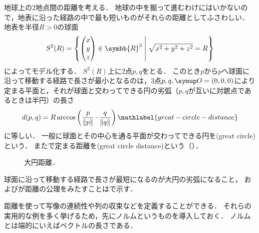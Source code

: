 \documentclass{ltjsbook}
\begin{document}
\begin{example}
地球上の\(2\)地点間の距離を考える．
地球の中を掘って進むわけにはいかないので，地表に沿った経路の中で最も短いものがそれらの距離としてふさわしい．
地表を半径\(R > 0\)の球面
\begin{align*}
    S^2(R) = \left\{ \begin{pmatrix} x \\ y \\ z \end{pmatrix} \in \symbb{R}^3 \relmiddle{|} \sqrt{x^2 + y^2 + z^2} = R \right\}
\end{align*}
によってモデル化する．
\(S^2(R)\)上に\(2\)点\(p, q\)をとる．
このとき\(p\)から\(p\)へ球面に沿って移動する経路で長さが最小となるのは，\(3\)点\(p, q, \origin = (0, 0, 0)\)により定まる平面と，それが球面と交わってできる円の劣弧（\(p, q\)が互いに対蹠点であるときは半円）の長さ
\begin{align}
    d(p, q) = R \arccos\left(\frac{p}{\lVert p \rVert} \cdot \frac{q}{\lVert q \rVert}\right) \mathlabel{great-circle-distance}
\end{align}
に等しい．
一般に球面とその中心を通る平面が交わってできる円を(great circle)という．
またで定まる距離を(great circle distance)という（）．
\begin{figure}
    \centering
    
    \caption{大円距離．}
\end{figure}
球面に沿って移動する経路で長さが最短になるのが大円の劣弧になること，
およびが距離の公理をみたすことはで示す．
\end{example}

距離を使って写像の連続性や列の収束などを定義することができる．
それらの実用的な例を多く挙げるため，先にノルムというものを導入しておく．
ノルムとは端的にいえばベクトルの長さである．
\end{document}
